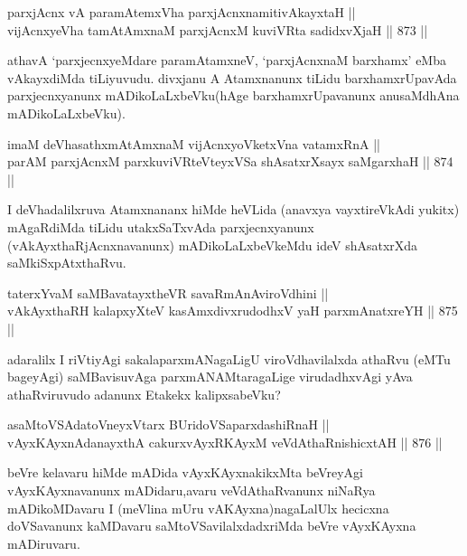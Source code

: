 \begin{shl}
parxjAcnx vA paramAtemxVha parxjAcnxnamitivAkayxtaH ||  \\
vijAcnxyeVha tamAtAmxnaM parxjAcnxM kuviVRta sadidxvXjaH \hfill || 873 ||  
\end{shl}

\begin{artha}
athavA `parxjecnxyeMdare paramAtamxneV, `parxjAcnxnaM barxhamx' eMba vAkayxdiMda tiLiyuvudu. divxjanu A Atamxnanunx tiLidu barxhamxrUpavAda parxjecnxyanunx mADikoLaLxbeVku(hAge barxhamxrUpavanunx anusaMdhAna mADikoLaLxbeVku).
\end{artha}


\begin{shl}
imaM deVhasathxmAtAmxnaM vijAcnxyoVketxVna vatamxRnA || \\
parAM parxjAcnxM parxkuviVRteVteyxVSa shAsatxrXsayx saMgarxhaH \hfill || 874 ||  
\end{shl}

\begin{artha}
I deVhadalilxruva Atamxnananx hiMde heVLida (anavxya vayxtireVkAdi yukitx) mAgaRdiMda tiLidu utakxSaTxvAda parxjecnxyanunx (vAkAyxthaRjAcnxnavanunx) mADikoLaLxbeVkeMdu ideV shAsatxrXda saMkiSxpAtxthaRvu.
\end{artha}

\begin{shl}
taterxYvaM saMBavatayxtheVR savaRmAnAviroVdhini ||  \\
vAkAyxthaRH kalapxyXteV kasAmxdivxrudodhxV yaH parxmAnatxreYH \hfill || 875 ||  
\end{shl}

\begin{artha}
adaralilx I riVtiyAgi sakalaparxmANagaLigU viroVdhavilalxda athaRvu (eMTu bageyAgi) saMBavisuvAga parxmANAMtaragaLige virudadhxvAgi yAva athaRviruvudo adanunx Etakekx kalipxsabeVku?
\end{artha}


\begin{shl}
asaMtoVSAdatoV\s neyxV\s tarx BUridoVSaparxdashiRnaH || \\
vAyxKAyxnAdanayxthA cakurxvAyxRKAyxM veVdAthaRnishicxtAH \hfill || 876 ||  
\end{shl}

\begin{artha}
beVre kelavaru hiMde mADida vAyxKAyxnakikxMta beVreyAgi vAyxKAyxnavanunx mADidaru,avaru veVdAthaRvanunx niNaRya mADikoMDavaru I (meVlina mUru vAKAyxna)nagaLalUlx hecicxna doVSavanunx kaMDavaru saMtoVSavilalxdadxriMda beVre vAyxKAyxna mADiruvaru.
\end{artha}

